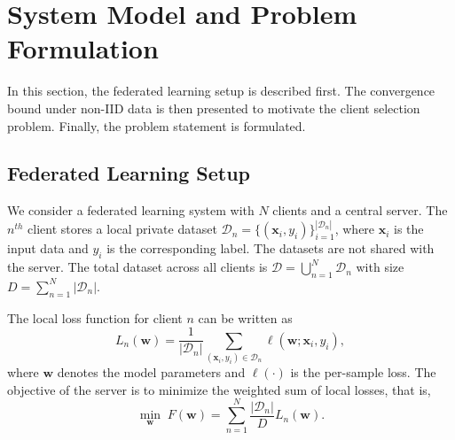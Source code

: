 \documentclass[journal]{IEEEtran}
\begin{document}
\section{System Model and Problem Formulation}

In this section, the federated learning setup is described first. The convergence bound under non-IID data is then presented to motivate the client selection problem. Finally, the problem statement is formulated.

\subsection{Federated Learning Setup}

We consider a federated learning system with $N$ clients and a central server. The $n^{th}$ client stores a local private dataset $\mathcal{D}_n = \{(\bm{x}_i, y_i)\}_{i=1}^{|\mathcal{D}_n|}$, where $\bm{x}_i$ is the input data and $y_i$ is the corresponding label. The datasets are not shared with the server. The total dataset across all clients is $\mathcal{D} = \bigcup_{n=1}^{N} \mathcal{D}_n$ with size $D = \sum_{n=1}^{N} |\mathcal{D}_n|$.

The local loss function for client $n$ can be written as
\begin{equation}
L_n(\bm{w}) = \frac{1}{|\mathcal{D}_n|} \sum_{(\bm{x}_i, y_i) \in \mathcal{D}_n} \ell(\bm{w}; \bm{x}_i, y_i),
\label{eq:local_loss}
\end{equation}
where $\bm{w}$ denotes the model parameters and $\ell(\cdot)$ is the per-sample loss. The objective of the server is to minimize the weighted sum of local losses, that is,
\begin{equation}
\min_{\bm{w}} \; F(\bm{w}) = \sum_{n=1}^{N} \frac{|\mathcal{D}_n|}{D} L_n(\bm{w}).
\label{eq:global_obj}
\end{equation}
\end{document}
